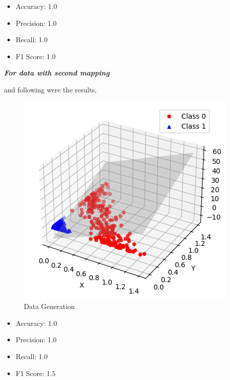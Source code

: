 \documentclass[11pt,a4paper]{article}
\begin{document}
\begin{itemize}
    \item Accuracy: 1.0
    \item Precision: 1.0 
    \item Recall: 1.0 
    \item F1 Score: 1.0
\end{itemize}



\textbf{\textit{For data with second mapping}}\\

\lstset{style=mystyle}


and following were the results,

{\begin{figure}[h]
    \centering
    \includegraphics[width=1.0\linewidth]{images/5.png}
    \caption{Data Generation}
\end{figure}}


\begin{itemize}
    \item Accuracy: 1.0 
    \item Precision: 1.0 
    \item Recall: 1.0 
    \item F1 Score: 1.5
\end{itemize}
\end{document}
